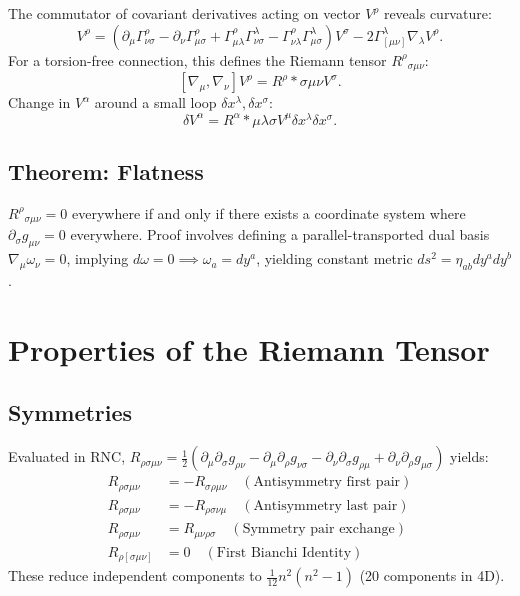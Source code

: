 \documentclass[11pt, a4paper]{report}
\begin{document}
The commutator of covariant derivatives acting on vector $V^\rho$ reveals curvature:
\begin{equation}
[\nabla_\mu, \nabla_\nu] V^\rho = \left( \partial_\mu \Gamma^\rho_{\nu\sigma} - \partial_\nu \Gamma^\rho_{\mu\sigma} + \Gamma^\rho_{\mu\lambda} \Gamma^\lambda_{\nu\sigma} - \Gamma^\rho_{\nu\lambda} \Gamma^\lambda_{\mu\sigma} \right) V^\sigma - 2\Gamma^\lambda_{[\mu\nu]} \nabla_\lambda V^\rho.
\end{equation}
For a torsion-free connection, this defines the Riemann tensor ${R^\rho}_{\sigma\mu\nu}$:
\begin{equation}\label{eq:riemann_def}
[\nabla_\mu, \nabla_\nu] V^\rho = {R^\rho}*{\sigma\mu\nu} V^\sigma.
\end{equation}
Change in $V^\alpha$ around a small loop $\delta x^\lambda, \delta x^\sigma$:
\begin{equation}
\delta V^{\alpha} = {R^{\alpha}}*{\mu\lambda\sigma} V^{\mu} \delta x^{\lambda} \delta x^{\sigma}.
\end{equation}

\subsection*{Theorem: Flatness}
$R^\rho{}_{\sigma\mu\nu} = 0$ everywhere if and only if there exists a coordinate system where $\partial_\sigma g_{\mu\nu} = 0$ everywhere.
Proof involves defining a parallel-transported dual basis $\nabla_\mu \omega_\nu = 0$, implying $d\omega = 0 \implies \omega_a = dy^a$, yielding constant metric $ds^2 = \eta_{ab} dy^a dy^b$.

\section{Properties of the Riemann Tensor}
\subsection*{Symmetries}
Evaluated in RNC, $R_{\rho\sigma\mu\nu} = \frac{1}{2} (\partial_\mu \partial_\sigma g_{\rho\nu} - \partial_\mu \partial_\rho g_{\nu\sigma} - \partial_\nu \partial_\sigma g_{\rho\mu} + \partial_\nu \partial_\rho g_{\mu\sigma})$ yields:
\begin{align}
R_{\rho\sigma\mu\nu} &= -R_{\sigma\rho\mu\nu} \quad (\text{Antisymmetry first pair}) \\
R_{\rho\sigma\mu\nu} &= -R_{\rho\sigma\nu\mu} \quad (\text{Antisymmetry last pair}) \\
R_{\rho\sigma\mu\nu} &= R_{\mu\nu\rho\sigma} \quad (\text{Symmetry pair exchange}) \\
R_{\rho[\sigma\mu\nu]} &= 0 \quad (\text{First Bianchi Identity})
\end{align}
These reduce independent components to $\frac{1}{12}n^2(n^2 - 1)$ (20 components in 4D).
\end{document}
